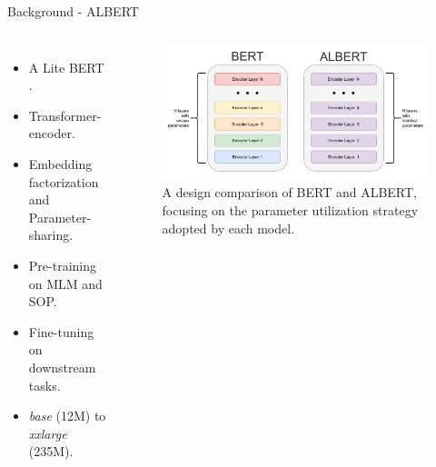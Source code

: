 \documentclass[aspectratio=169,xcolor=dvipsnames]{beamer}
\begin{document}
\begin{frame}{Background - ALBERT}
\begin{columns}[c] %

\begin{itemize}
    \item A Lite BERT \citep{albert-zhenzhong}.
    \item Transformer-encoder.
    \item Embedding factorization and Parameter-sharing.
    \item Pre-training on MLM and SOP.
    \item Fine-tuning on downstream tasks.
    \item \textit{base} (12M) to \textit{xxlarge} (235M).
\end{itemize}

\begin{figure}
    \centering
    \includegraphics[width=\columnwidth]{images/bert-vs-albert-architecture.pdf}
    \caption{A design comparison of BERT and ALBERT, focusing on the parameter utilization strategy adopted by each model.}
    \label{fig:bert-vs-albert-architecture}
\end{figure}

\end{columns}
\end{frame}
\end{document}
